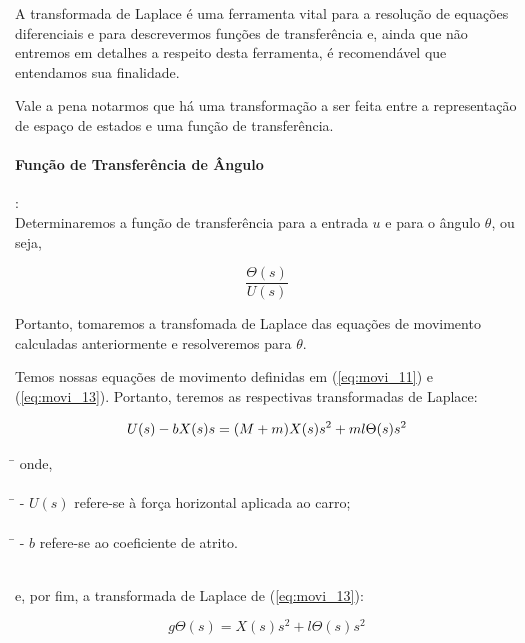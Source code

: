 \documentclass[a4paper, 12pt]{article}
\begin{document}
A transformada de Laplace é uma ferramenta vital para a resolução de equações diferenciais e para descrevermos funções de transferência e, ainda que não entremos em detalhes a respeito desta ferramenta, é recomendável que entendamos sua finalidade.

Vale a pena notarmos que há uma transformação a ser feita entre a representação de espaço de estados e uma função de transferência.

\paragraph{Função de Transferência de Ângulo}:\\

\>Determinaremos a função de transferência para a entrada $u$ e para o ângulo $\theta$, ou seja,

\begin{equation}\label{eq:transf_func_model}
    \frac{\Theta(s)}{U(s)}
\end{equation}

Portanto, tomaremos a transfomada de Laplace das equações de movimento calculadas anteriormente e resolveremos para $\theta$. 

Temos nossas equações de movimento definidas em (\ref{eq:movi_11}) e (\ref{eq:movi_13}). Portanto, teremos as respectivas transformadas de Laplace:

\begin{equation}\label{eq:laplace_transform}
    U(s)-bX(s)s = (M+m)X(s)s^2+ml\Theta(s)s^2\\
\end{equation}

\begin{tabbing}
    \qquad\qquad\=\> onde,\\
    \\\qquad\qquad\qquad\=\> - $U(s)$ refere-se à força horizontal aplicada ao carro;\\
    \\\qquad\qquad\qquad\=\> - $b$ refere-se ao coeficiente de atrito.\\
        
\end{tabbing}

\\e, por fim, a transformada de Laplace de (\ref{eq:movi_13}):

\begin{equation}\label{eq:laplace_transform2}
    g\Theta(s)=X(s)s^2+l\Theta(s)s^2
\end{equation}
\end{document}
